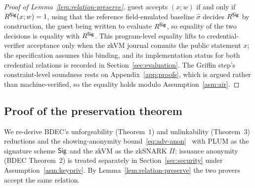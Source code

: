 \begin{proof}[Proof of Lemma~\ref{lem:relation-preserve}]
guest accepts $(x;w)$ if and only if $R^{\mathsf{Sig}}(x;w)=1$, using that the reference field-emulated baseline $\hat\sigma$ decides $R^{\mathsf{Sig}}$ by construction, the guest being written to evaluate $R^{\mathsf{Sig}}$, so equality of the two decisions is equality with $R^{\mathsf{Sig}}$. This program-level equality lifts to credential-verifier acceptance only when the zkVM journal commits the public statement $x$; the specification assumes this binding, and its implementation status for both credential relations is recorded in Section~\ref{sec:evaluation}. The Griffin step's constraint-level soundness rests on Appendix~\ref{app:proofs}, which is argued rather than machine-verified, so the equality holds modulo Assumption~\ref{asm:air}.
\end{proof}

\subsection{Proof of the preservation theorem}\label{app:prsv-thm}
We re-derive BDEC's unforgeability (Theorem~1) and unlinkability (Theorem~3) reductions and the showing-anonymity bound~\eqref{eq:adv-anon}~\cite{10.1007/978-981-96-0957-4_3} with PLUM as the signature scheme $\mathsf{Sig}$ and the zkVM as the zkSNARK $\Pi$; issuance anonymity (BDEC Theorem~2) is treated separately in Section~\ref{sec:security} under Assumption~\ref{asm:keypriv}. By Lemma~\ref{lem:relation-preserve} the two provers accept the same relation.

